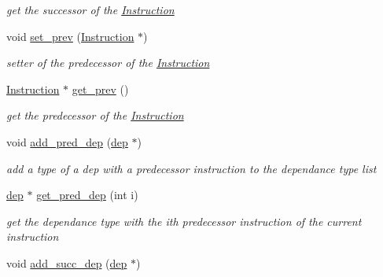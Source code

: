 \begin{DoxyCompactItemize}
\begin{DoxyCompactList}\small\item\em get the successor of the \hyperlink{classInstruction}{\-Instruction} \end{DoxyCompactList}\item 
\hypertarget{classInstruction_a69d2992a0eb1fbe5fb6a38b52e13a804}{void \hyperlink{classInstruction_a69d2992a0eb1fbe5fb6a38b52e13a804}{set\-\_\-prev} (\hyperlink{classInstruction}{\-Instruction} $\ast$)}\label{classInstruction_a69d2992a0eb1fbe5fb6a38b52e13a804}

\begin{DoxyCompactList}\small\item\em setter of the predecessor of the \hyperlink{classInstruction}{\-Instruction} \end{DoxyCompactList}\item 
\hypertarget{classInstruction_afd6f27235469926b1e7979220495a6f0}{\hyperlink{classInstruction}{\-Instruction} $\ast$ \hyperlink{classInstruction_afd6f27235469926b1e7979220495a6f0}{get\-\_\-prev} ()}\label{classInstruction_afd6f27235469926b1e7979220495a6f0}

\begin{DoxyCompactList}\small\item\em get the predecessor of the \hyperlink{classInstruction}{\-Instruction} \end{DoxyCompactList}\item 
\hypertarget{classInstruction_a3121dad231e2b4c27ac3cae6c8627ece}{void \hyperlink{classInstruction_a3121dad231e2b4c27ac3cae6c8627ece}{add\-\_\-pred\-\_\-dep} (\hyperlink{structdep}{dep} $\ast$)}\label{classInstruction_a3121dad231e2b4c27ac3cae6c8627ece}

\begin{DoxyCompactList}\small\item\em add a type of a dep with a predecessor instruction to the dependance type list \end{DoxyCompactList}\item 
\hypertarget{classInstruction_ab32531f8dd490b1c8396b6723f87bfae}{\hyperlink{structdep}{dep} $\ast$ \hyperlink{classInstruction_ab32531f8dd490b1c8396b6723f87bfae}{get\-\_\-pred\-\_\-dep} (int i)}\label{classInstruction_ab32531f8dd490b1c8396b6723f87bfae}

\begin{DoxyCompactList}\small\item\em get the dependance type with the ith predecessor instruction of the current instruction \end{DoxyCompactList}\item 
\hypertarget{classInstruction_acefc258dbcf45c19136dc86e47a82c0e}{void \hyperlink{classInstruction_acefc258dbcf45c19136dc86e47a82c0e}{add\-\_\-succ\-\_\-dep} (\hyperlink{structdep}{dep} $\ast$)}\label{classInstruction_acefc258dbcf45c19136dc86e47a82c0e}


\end{DoxyCompactItemize}
